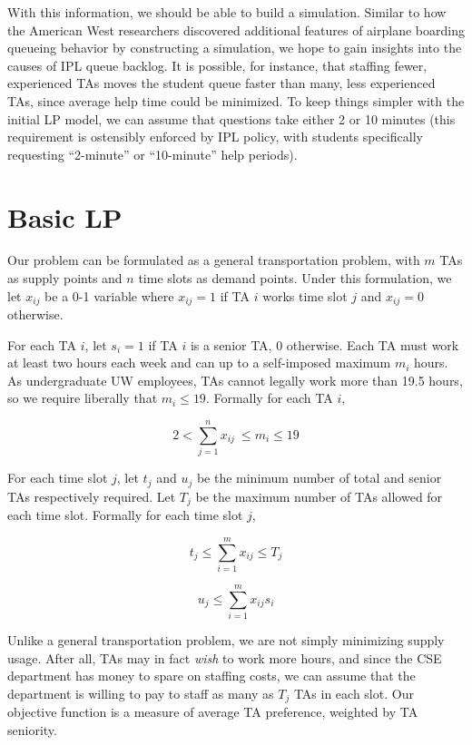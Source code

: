 \documentclass{article}
\begin{document}
\begin{multicols}{2}
With this information, we should be able to build a simulation. Similar to how the American West researchers discovered additional features of airplane boarding queueing behavior by constructing a simulation, we hope to gain insights into the causes of IPL queue backlog. It is possible, for instance, that staffing fewer, experienced TAs moves the student queue faster than many, less experienced TAs, since average help time could be minimized. To keep things simpler with the initial LP model, we can assume that questions take either 2 or 10 minutes (this requirement is ostensibly enforced by IPL policy, with students specifically requesting ``2-minute'' or ``10-minute'' help periods).

\section*{Basic LP}
Our problem can be formulated as a general transportation problem, with $m$ TAs as supply points and $n$ time slots as demand points. Under this formulation, we let $x_{ij}$ be a 0-1 variable where $x_{ij} = 1$ if TA $i$ works time slot $j$ and $x_{ij} = 0$ otherwise.

For each TA $i$, let $s_i = 1$ if TA $i$ is a senior TA, 0 otherwise. Each TA must work at least two hours each week and can up to a self-imposed maximum $m_i$ hours. As undergraduate UW employees, TAs cannot legally work more than 19.5 hours, so we require liberally that $m_i \leq 19$. Formally for each TA $i$,

\begin{equation}
2 < \sum_{j=1}^{n}x_{ij}\ \leq m_i \leq 19
\end{equation}

For each time slot $j$, let $t_j$ and $u_j$ be the minimum number of total and senior TAs respectively required. Let $T_j$ be the maximum number of TAs allowed for each time slot. Formally for each time slot $j$,

\begin{equation}
t_j \leq \sum_{i=1}^{m}x_{ij} \leq T_j
\end{equation}

\begin{equation}
u_j \leq \sum_{i=1}^{m}x_{ij}s_i
\end{equation}

Unlike a general transportation problem, we are not simply minimizing supply usage. After all, TAs may in fact \textit{wish} to work more hours, and since the CSE department has money to spare on staffing costs, we can assume that the department is willing to pay to staff as many as $T_j$ TAs in each slot. Our objective function is a measure of average TA preference, weighted by TA seniority.


\end{multicols}
\end{document}
